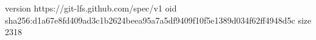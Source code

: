 version https://git-lfs.github.com/spec/v1
oid sha256:d1a67e8fd409ad3c1b2624beea95a7a5df9409f10f5e1389d034f62ff4948d5c
size 2318
